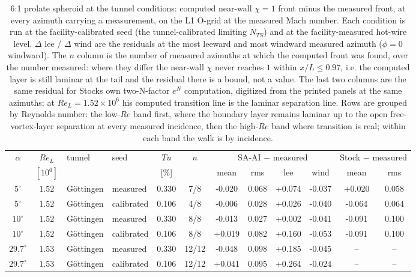 \begin{table}[H]
  \centering\small
  \caption{6:1 prolate spheroid at the tunnel conditions: computed near-wall $\chi\!=\!1$ front minus the measured front, at every azimuth carrying a measurement, on the L1 O-grid at the measured Mach number. Each condition is run at the facility-calibrated seed (the tunnel-calibrated limiting $N_{TS}$) and at the facility-measured hot-wire level. $\Delta$ lee / $\Delta$ wind are the residuals at the most leeward and most windward measured azimuth ($\phi\!=\!0$ windward). The $n$ column is the number of measured azimuths at which the computed front was found, over the number measured: where they differ the near-wall $\chi$ never reaches $1$ within $x/L\!\le\!0.97$, i.e. the computed layer is still laminar at the tail and the residual there is a bound, not a value. The last two columns are the same residual for Stocks own two-N-factor $e^N$ computation, digitized from the printed panels at the same azimuths; at $Re_L\!=\!1.52\!\times\!10^6$ his computed transition line is the laminar separation line. Rows are grouped by Reynolds number: the low-$Re$ band first, where the boundary layer remains laminar up to the open free-vortex-layer separation at every measured incidence, then the high-$Re$ band where transition is real; within each band the walk is by incidence.}
  \label{tab:sphtunnel}
  \begin{tabular}{cc l l c c cccc cc}
    \toprule
    $\alpha$ & $Re_L$ & tunnel & seed & $Tu$ & $n$ & \multicolumn{4}{c}{SA-AI $-$ measured} & \multicolumn{2}{c}{Stock $-$ measured} \\
    & $[10^6]$ & & & [\%] & & mean & rms & lee & wind & mean & rms \\
    \midrule
    $5^\circ$ & $1.52$ & G\"ottingen & measured & 0.330 & 7/8 & -0.020 & 0.068 & +0.074 & -0.037 & +0.020 & 0.058 \\
    $5^\circ$ & $1.52$ & G\"ottingen & calibrated & 0.106 & 4/8 & -0.006 & 0.028 & +0.026 & -0.040 & -0.064 & 0.064 \\
    $10^\circ$ & $1.52$ & G\"ottingen & measured & 0.330 & 8/8 & -0.013 & 0.027 & +0.002 & -0.041 & -0.091 & 0.100 \\
    $10^\circ$ & $1.52$ & G\"ottingen & calibrated & 0.106 & 8/8 & +0.019 & 0.082 & +0.160 & -0.053 & -0.091 & 0.100 \\
    $29.7^\circ$ & $1.53$ & G\"ottingen & measured & 0.330 & 12/12 & -0.048 & 0.098 & +0.185 & -0.045 & -- & -- \\
    $29.7^\circ$ & $1.53$ & G\"ottingen & calibrated & 0.106 & 12/12 & +0.041 & 0.095 & +0.264 & -0.024 & -- & -- \\

\end{tabular}
\end{table}
